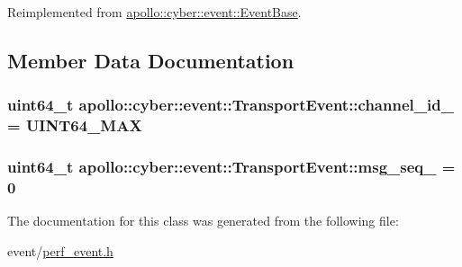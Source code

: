 Reimplemented from \hyperlink{classapollo_1_1cyber_1_1event_1_1EventBase_ae70276f235359287b75a72b932903bf1}{apollo\-::cyber\-::event\-::\-Event\-Base}.



\subsection{Member Data Documentation}
\hypertarget{classapollo_1_1cyber_1_1event_1_1TransportEvent_af51920d21d6e09ef4fb6c685c7293358}{
\subsubsection[{channel\-\_\-id\-\_\-}]{\setlength{\rightskip}{0pt plus 5cm}uint64\-\_\-t apollo\-::cyber\-::event\-::\-Transport\-Event\-::channel\-\_\-id\-\_\- = U\-I\-N\-T64\-\_\-\-M\-A\-X\hspace{0.3cm}{\ttfamily [private]}}}\label{classapollo_1_1cyber_1_1event_1_1TransportEvent_af51920d21d6e09ef4fb6c685c7293358}
\hypertarget{classapollo_1_1cyber_1_1event_1_1TransportEvent_a758b86060a07b28a79c70d6ce8a832d9}{
\subsubsection[{msg\-\_\-seq\-\_\-}]{\setlength{\rightskip}{0pt plus 5cm}uint64\-\_\-t apollo\-::cyber\-::event\-::\-Transport\-Event\-::msg\-\_\-seq\-\_\- = 0\hspace{0.3cm}{\ttfamily [private]}}}\label{classapollo_1_1cyber_1_1event_1_1TransportEvent_a758b86060a07b28a79c70d6ce8a832d9}


The documentation for this class was generated from the following file\-:\begin{DoxyCompactItemize}
\item 
event/\hyperlink{perf__event_8h}{perf\-\_\-event.\-h}\end{DoxyCompactItemize}
